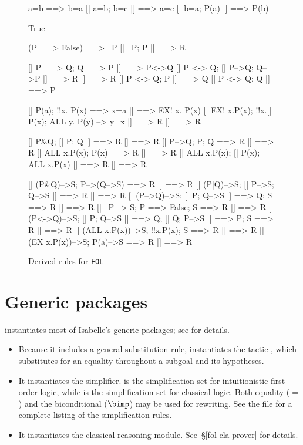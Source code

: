 \begin{figure} 
\begin{ttbox}
       a=b ==> b=a
     [| a=b;  b=c |] ==> a=c
    [| b=a;  P(a) |] ==> P(b)

     True

      (P ==> False) ==> ~P
      [| ~P;  P |] ==> R

      [| P ==> Q;  Q ==> P |] ==> P<->Q
      [| P <-> Q;  [| P-->Q; Q-->P |] ==> R |] ==> R
     [| P <-> Q;  P |] ==> Q            
     [| P <-> Q;  Q |] ==> P

      [| P(a);  !!x. P(x) ==> x=a |]  ==>  EX! x. P(x)
      [| EX! x.P(x);  !!x.[| P(x);  ALL y. P(y) --> y=x |] ==> R 
          |] ==> R

     [| P&Q;  [| P; Q |] ==> R |] ==> R
      [| P-->Q;  P;  Q ==> R |] ==> R
      [| ALL x.P(x);  P(x) ==> R |] ==> R
  [| ALL x.P(x);  [| P(x); ALL x.P(x) |] ==> R |] ==> R

 [| (P&Q)-->S;  P-->(Q-->S) ==> R |] ==> R
 [| (P|Q)-->S;  [| P-->S; Q-->S |] ==> R |] ==> R
  [| (P-->Q)-->S;  [| P; Q-->S |] ==> Q;  S ==> R |] ==> R
  [| ~P --> S;  P ==> False;  S ==> R |] ==> R
  [| (P<->Q)-->S; [| P; Q-->S |] ==> Q; [| Q; P-->S |] ==> P;
             S ==> R |] ==> R
  [| (ALL x.P(x))-->S;  !!x.P(x);  S ==> R |] ==> R
   [| (EX x.P(x))-->S;  P(a)-->S ==> R |] ==> R
\end{ttbox}
\caption{Derived rules for {\tt FOL}} \label{fol-int-derived}
\end{figure}


\section{Generic packages}
\FOL{} instantiates most of Isabelle's generic packages;
see  for details.
\begin{itemize}
\item 
Because it includes a general substitution rule, \FOL{} instantiates the
tactic , which substitutes for an equality
throughout a subgoal and its hypotheses.
\item 
It instantiates the simplifier.  is the simplification
set for intuitionistic first-order logic, while  is the
simplification set for classical logic.  Both equality ($=$) and the
biconditional ($\bimp$) may be used for rewriting.  See the file
 for a complete listing of the simplification
rules. 
\item 
It instantiates the classical reasoning module.  See~\S\ref{fol-cla-prover}
for details. 
\end{itemize}


